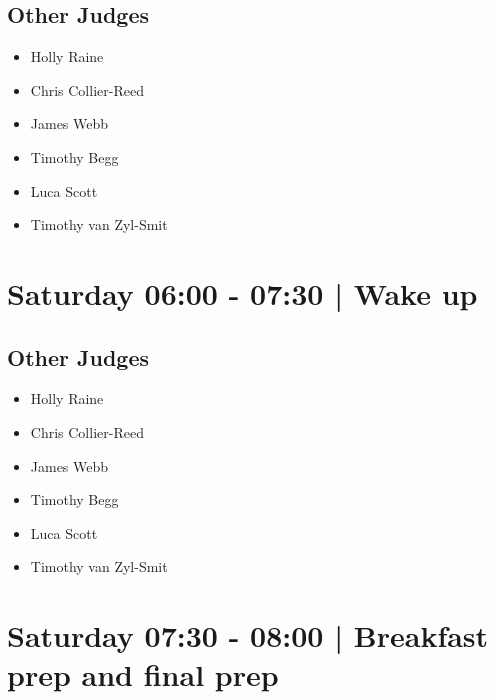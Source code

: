 \documentclass[10pt, A5]{article}
\begin{document}
                
        \subsection*{Other Judges}
        
            \begin{itemize}
                            \item Holly Raine
                            \item Chris Collier-Reed
                            \item James Webb
                            \item Timothy Begg
                            \item Luca Scott
                            \item Timothy van Zyl-Smit
                        \end{itemize}
        

            \section*{Saturday 06:00
        -
        07:30
        |
         Wake up}
        
                
        \subsection*{Other Judges}
        
            \begin{itemize}
                            \item Holly Raine
                            \item Chris Collier-Reed
                            \item James Webb
                            \item Timothy Begg
                            \item Luca Scott
                            \item Timothy van Zyl-Smit
                        \end{itemize}
        

            \section*{Saturday 07:30
        -
        08:00
        |
         Breakfast prep and final prep}
        
                
\end{document}
